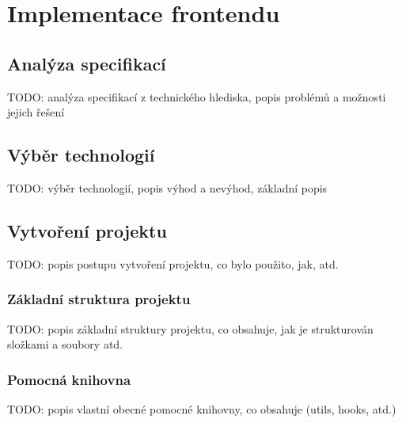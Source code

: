 \chapter{Implementace frontendu}
\label{chap:implementace-frontendu}

\section{Analýza specifikací}
\label{sec:implementace-analyza}
TODO: analýza specifikací z technického hlediska, popis problémů a možnosti jejich řešení

\section{Výběr technologií}
\label{sec:implementace-vyber-technologii}
TODO: výběr technologií, popis výhod a nevýhod, základní popis

\section{Vytvoření projektu}
\label{sec:implementace-vytvoreni-projektu}
TODO: popis postupu vytvoření projektu, co bylo použito, jak, atd.

\subsection{Základní struktura projektu}
\label{sec:implementace-vytvoreni-projektu-zakladni-struktura}
TODO: popis základní struktury projektu, co obsahuje, jak je strukturován složkami a soubory atd.

\subsection{Pomocná knihovna}
\label{sec:implementace-vytvoreni-projektu-pomocna-knihovna}
TODO: popis vlastní obecné pomocné knihovny, co obsahuje (utils, hooks, atd.)

